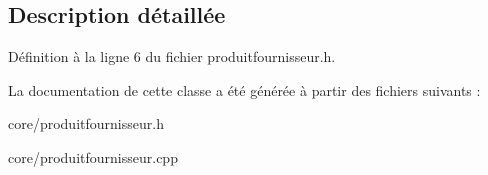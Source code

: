 \subsection{Description détaillée}


Définition à la ligne 6 du fichier produitfournisseur.h.



La documentation de cette classe a été générée à partir des fichiers suivants :\begin{DoxyCompactItemize}
\item 
core/produitfournisseur.h\item 
core/produitfournisseur.cpp\end{DoxyCompactItemize}
